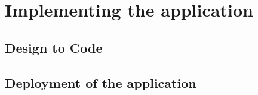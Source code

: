 \section{Implementing the application}
    \subsection{Design to Code}
    \subsection{Deployment of the application} 